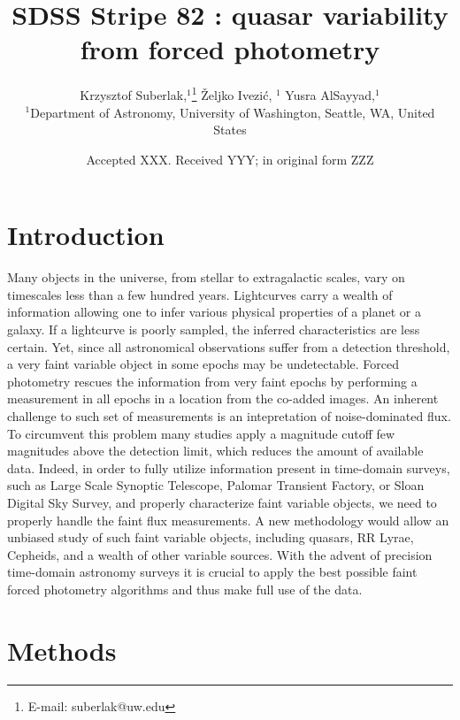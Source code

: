 \documentclass[fleqn,usenatbib]{mnras}  %
\title[SDSS Quasars]{SDSS Stripe 82 : quasar variability from forced photometry}
\author[K. Suberlak et al.]{
Krzysztof Suberlak,$^{1}$\thanks{E-mail: suberlak@uw.edu}
\v{Z}eljko Ivezi\'c, $^{1}$
Yusra AlSayyad,$^{1}$ 
\\
$^{1}$Department of Astronomy, University of Washington, Seattle, WA, United States\\
}
\date{Accepted XXX. Received YYY; in original form ZZZ}
\begin{document}
\label{firstpage}
\pagerange{\pageref{firstpage}--\pageref{lastpage}}
\maketitle

\begin{abstract}

\end{abstract}




\section{Introduction}
\label{sec:intro}
Many objects in the universe, from stellar to extragalactic scales, vary on timescales less than a few hundred years. Lightcurves carry a wealth of information allowing one to infer various physical properties of a planet or a galaxy. If a lightcurve is poorly sampled, the inferred  characteristics are less certain. Yet, since all  astronomical observations suffer from a detection threshold, a very faint variable object in some epochs may be undetectable. Forced photometry rescues the information from very faint epochs by performing a measurement in all epochs in a location from the co-added images. An inherent challenge to such set of measurements is an intepretation of noise-dominated flux. To circumvent this problem many studies apply a magnitude cutoff few magnitudes above the detection limit, which reduces the amount of available data. Indeed, in order to fully utilize information present in time-domain surveys, such as Large Scale Synoptic Telescope, Palomar Transient Factory, or Sloan Digital Sky Survey, and properly characterize faint variable objects, we need to properly handle the faint flux measurements. A new methodology would allow an unbiased  study of such faint variable objects, including quasars,  RR Lyrae,  Cepheids, and a wealth of other variable sources.  With the advent of precision  time-domain astronomy  surveys it is crucial to apply the best possible faint forced photometry algorithms and thus make full use of the  data.  

\section{Methods}
\end{document}
